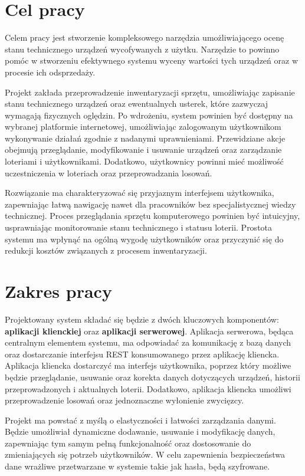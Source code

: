 \section{Cel pracy}
Celem  pracy jest stworzenie kompleksowego narzędzia umożliwiającego ocenę stanu technicznego urządzeń wycofywanych z użytku. Narzędzie to powinno pomóc w stworzeniu  efektywnego systemu wyceny wartości tych urządzeń oraz w procesie ich odsprzedaży.

Projekt zakłada przeprowadzenie inwentaryzacji sprzętu, umożliwiając zapisanie stanu technicznego urządzeń oraz ewentualnych usterek, które zazwyczaj wymagają fizycznych oględzin. Po wdrożeniu, system powinien być dostępny na wybranej platformie internetowej, umożliwiając zalogowanym użytkownikom wykonywanie działań zgodnie z nadanymi uprawnieniami. Przewidziane akcje obejmują przeglądanie, modyfikowanie i usuwanie urządzeń oraz zarządzanie loteriami i użytkownikami. Dodatkowo, użytkownicy powinni mieć możliwość uczestniczenia w loteriach oraz przeprowadzania losowań.

Rozwiązanie ma charakteryzować się przyjaznym interfejsem użytkownika, zapewniając łatwą nawigację nawet dla pracowników bez specjalistycznej wiedzy technicznej. Proces przeglądania sprzętu komputerowego powinien być intuicyjny, usprawniając monitorowanie stanu technicznego i statusu loterii. Prostota systemu ma wpłynąć na ogólną wygodę użytkowników oraz przyczynić się do redukcji kosztów związanych z procesem inwentaryzacji.

\section{Zakres pracy}
Projektowany system składać się będzie z dwóch kluczowych komponentów: \textbf{aplikacji klienckiej} oraz \textbf{aplikacji serwerowej}. 
Aplikacja serwerowa, będąca centralnym elementem systemu, ma odpowiadać za komunikację z bazą danych oraz dostarczanie interfejsu REST konsumowanego przez aplikację kliencka. 
Aplikacja kliencka dostarczyć ma interfejs użytkownika, poprzez który możliwe będzie przeglądanie, usuwanie oraz korekta danych dotyczących urządzeń, historii przeprowadzonych i aktualnych loterii. Dodatkowo, aplikacja kliencka umożliwi przeprowadzenie losowań oraz jednoznaczne wyłonienie zwycięzcy.

Projekt ma powstać z myślą o elastyczności i łatwości zarządzania danymi. Będzie umożliwiał dynamiczne dodawanie, usuwanie i modyfikację danych, zapewniając tym samym pełną funkcjonalność oraz dostosowanie do zmieniających się potrzeb użytkowników. W celu zapewnienia bezpieczeństwa dane wrażliwe przetwarzane w systemie takie jak hasła, będą szyfrowane.


